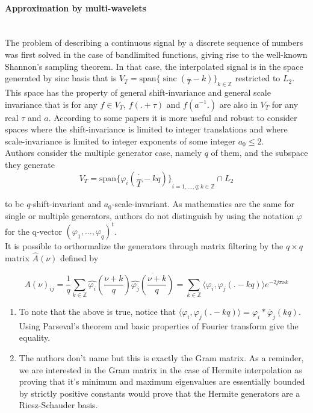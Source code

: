 \documentclass[a4paper, 11pt]{article}
\DeclareMathOperator*{\sinc}{sinc}
\begin{document}
\paragraph{Approximation by multi-wavelets} \mbox{} \\

The problem of describing a continuous signal by a discrete sequence of numbers was first solved in the case of 
bandlimited functions, giving rise to the well-known Shannon's sampling theorem. In that case, the interpolated signal 
is in the space generated by sinc basis that is $V_T = \text{span}{\{ \sinc(\frac{.}{T}-k) \}}_{k \in \mathbb{Z}}$ 
restricted to $L_2$. This space has the property of general shift-invariance and general scale invariance that is for 
any $f \in V_T$, $f(.+\tau)$ and $f(a^{-1}.)$ are also in $V_T$ for any real $\tau$ and $a$. According to some papers it 
is more useful and robust to consider spaces where the shift-invariance is limited to integer translations and where 
scale-invariance is limited to integer exponents of some integer $a_0 \leq 2$. \\

Authors consider the multiple generator case, namely $q$ of them, and the subspace they generate
\begin{equation*}
  V_T = \text{span}{\{ \varphi_i(\frac{.}{T}-kq) \}}_{i=1,\dots, q; k \in \mathbb{Z}} \cap L_2
\end{equation*}

to be $q$-shift-invariant and $a_0$-scale-invariant. As mathematics are the same for single or multiple generators, 
authors do not distinguish by using the notation $\varphi$ for the q-vector ${(\varphi_1, \dots, \varphi_q)}^t$. \\

It is possible to orthormalize the generators through matrix filtering by the $q\times q$ matrix $\hat{A}(\nu)$ defined 
by

\begin{equation*}
  {A(\nu)}_{ij}  = \frac{1}{q} \sum_{k \in \mathbb{Z}} 
  \hat{\varphi_i}(\frac{\nu+k}{q})\overline{\hat{\varphi_j}(\frac{\nu+k}{q})} = \sum_{k \in \mathbb{Z}} \langle \varphi_i, 
  \varphi_j(.-kq) \rangle e^{-2j\pi \nu k}
\end{equation*}

\begin{remark}{2}
  \begin{enumerate}
    \item To note that the above is true, notice that $\langle \varphi_i, \varphi_j(.-kq) \rangle = \varphi_i * \check{\varphi_j}
      (kq)$. Using Parseval's theorem and basic properties of Fourier transform give the equality.
    \item The authors don't name but this is exactly the Gram matrix. As a reminder, we are interested in the Gram 
    matrix in the case of Hermite interpolation as proving that it's minimum and maximum eigenvalues are essentially 
    bounded by strictly positive constants would prove that the Hermite generators are a Riesz-Schauder basis.
  \end{enumerate}
\end{remark}
\end{document}
